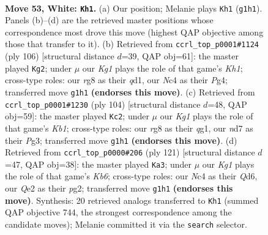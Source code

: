 \documentclass[11pt]{article}
\begin{document}
\clearpage

\begin{figure}[p]\centering
\begin{subfigure}{0.46\textwidth}\centering
\resizebox{\linewidth}{!}{%
\newchessgame
\chessboard[
  setfen={6r1/3n3k/1q6/1P5p/p1Np4/P7/4Q3/3R2K1 w - - 1 53},
  showmover=false,
  pgfstyle=straightmove, color=movearrow, markmove={g1-h1}
]}
\caption{}
\end{subfigure}\hfill
\begin{subfigure}{0.46\textwidth}\centering
\resizebox{\linewidth}{!}{%
\newchessgame
\chessboard[
  setfen={3r4/1p3k2/p4p2/P7/4Q1P1/5R2/7P/3q3K w - - 4 54},
  showmover=false,
  pgfstyle=straightmove, color=movearrow, markmove={h1-g2}
]}
\caption{}
\end{subfigure}
\\[4pt]
\begin{subfigure}{0.46\textwidth}\centering
\resizebox{\linewidth}{!}{%
\newchessgame
\chessboard[
  setfen={R4bk1/5p2/6N1/3p2Qp/8/6PP/8/1K4q1 w - - 17 53},
  showmover=false,
  pgfstyle=straightmove, color=movearrow, markmove={b1-c2}
]}
\caption{}
\end{subfigure}\hfill
\begin{subfigure}{0.46\textwidth}\centering
\resizebox{\linewidth}{!}{%
\newchessgame
\chessboard[
  setfen={8/8/3q2Np/4p3/1P6/1k1r4/5PPK/1Q6 b - - 8 61},
  showmover=false,
  pgfstyle=straightmove, color=movearrow, markmove={b3-a3}
]}
\caption{}
\end{subfigure}
\caption{\textbf{Move 53, White: \texttt{Kh1}.} (a) Our position; Melanie plays \texttt{Kh1} (\texttt{g1h1}). Panels (b)--(d) are the retrieved master positions whose correspondence most drove this move (highest QAP objective among those that transfer to it). (b) Retrieved from \texttt{ccrl\_top\_p0001\#1124} (ply 106) [structural distance $d$=39, QAP obj=61]: the master played \texttt{Kg2}; under $\mu$ our \emph{Kg1} plays the role of that game's \emph{Kh1}; cross-type roles: our \emph{r}g8 as their \emph{q}d1, our \emph{N}c4 as their \emph{P}g4; transferred move \texttt{g1h1} \textbf{(endorses this move)}. (c) Retrieved from \texttt{ccrl\_top\_p0001\#1230} (ply 104) [structural distance $d$=48, QAP obj=59]: the master played \texttt{Kc2}; under $\mu$ our \emph{Kg1} plays the role of that game's \emph{Kb1}; cross-type roles: our \emph{r}g8 as their \emph{q}g1, our \emph{n}d7 as their \emph{P}g3; transferred move \texttt{g1h1} \textbf{(endorses this move)}. (d) Retrieved from \texttt{ccrl\_top\_p0000\#206} (ply 121) [structural distance $d$=47, QAP obj=38]: the master played \texttt{Ka3}; under $\mu$ our \emph{Kg1} plays the role of that game's \emph{Kb6}; cross-type roles: our \emph{N}c4 as their \emph{Q}d6, our \emph{Q}e2 as their \emph{p}g2; transferred move \texttt{g1h1} \textbf{(endorses this move)}. Synthesis: 20 retrieved analogs transferred to \texttt{Kh1} (summed QAP objective 744, the strongest correspondence among the candidate moves); Melanie committed it via the \texttt{search} selector.}
\label{fig:thought-m104}
\end{figure}
\end{document}
